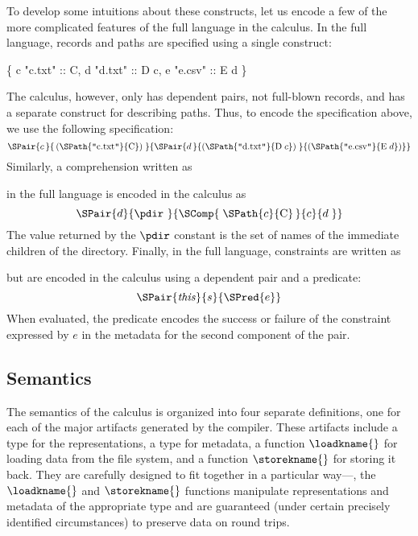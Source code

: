 To develop some intuitions about these constructs, let us encode a few
of the more complicated features of the full \forest{} language in the
calculus. In the full language, records and paths are specified using
a single construct:
%
\begin{centercode}
  \{ c  "c.txt" :: C, 
    d  "d.txt" :: D c, 
    e  "e.csv" :: E d \}
\end{centercode}
%
The calculus, however, only has dependent pairs, not full-blown
records, and has a separate construct for describing paths. Thus, to
encode the specification above, we use the following specification:
%
\[
\SPair{c\,}{\,(\SPath{\texttt{"}\mathrm{c.txt}\texttt{"}}{\mathrm{C}})\;}
           {\SPair{d\,}{(\SPath{\texttt{"}\mathrm{d.txt}\texttt{"}}{\mathrm{D}\; c})\;}
                       {(\SPath{\texttt{"}\mathrm{e.csv}\texttt{"}}{\mathrm{E}\; d})}} 
\]
%
Similarly, a comprehension written as
%
\begin{center}
\cd{[c :: C | c <- \kw{matches} (GL "*")]} 
\end{center}
%
in the full language is encoded in the calculus as
%
\[
\SPair{d}{\pdir~}{\SComp{\;\SPath{c}{\mathrm{C}}\,}{c}{d\;}}
\]
%
The value returned by the $\pdir$ constant is the set of names of the
immediate children of the directory. Finally, in the full language,
constraints are written as
%
\begin{center}
\end{center}
%
but are encoded in the calculus using a dependent pair and a
predicate:
%
\[
\SPair{\mathit{this}}{s}{\SPred{e}}
\]
%
When evaluated, the predicate encodes the success or failure of the
constraint expressed by $e$ in the metadata for the second component
of the pair.

\subsection{Semantics}
%
The semantics of the \forest{} calculus is organized into four
separate definitions, one for each of the major artifacts generated by
the compiler. These artifacts include a type for the representations,
a type for metadata, a function $\loadkname{}$ for loading data from
the file system, and a function $\storekname{}$ for storing it
back. They are carefully designed to fit together in a particular
way---\eg, the $\loadkname{}$ and $\storekname{}$ functions manipulate
representations and metadata of the appropriate type and are
guaranteed (under certain precisely identified circumstances) to
preserve data on round trips.

